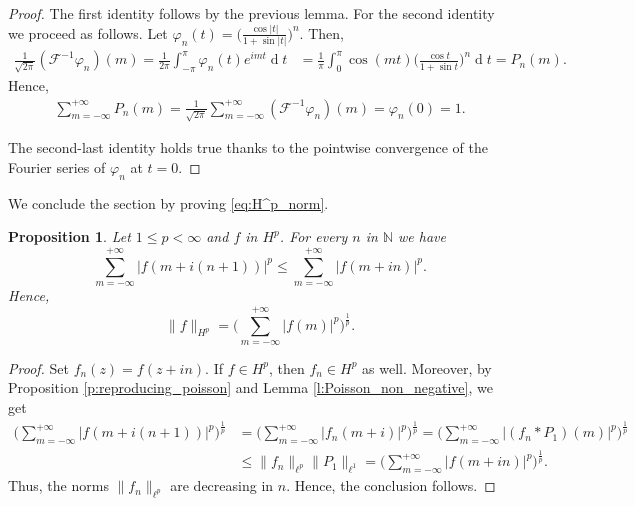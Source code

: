 \documentclass[12pt,a4paper,reqno]{amsart}
\newtheorem{prop}[thm]{Proposition}
\theoremstyle{definition}
\theoremstyle{definition}\newtheorem{defn}[thm]{Definition}
\begin{document}
    \begin{proof}
    The first identity follows by the previous lemma. For the second identity we proceed as follows.
     Let $\varphi_n(t)=\Big(\frac{\cos|t|}{1+\sin|t|}\Big)^n$. Then, 
    \begin{align}\label{eq:Poisson_coefficient}
     \frac{1}{\sqrt{2\pi}}(\mathcal F^{-1}\varphi_n)(m)=\frac{1}{2\pi}\int_{-\pi}^{\pi}\varphi_n(t) e^{imt}\operatorname{d}\!t&=\frac{1}{\pi}\int_0^\pi \cos(mt)\Big(\frac{\cos t}{1+\sin t }\Big)^n\operatorname{d}\! t=P_n(m).   
    \end{align}
    Hence,
    \begin{align*}
     \sum_{m=-\infty}^{+\infty}P_n(m)=\frac{1}{\sqrt{2\pi}} \sum_{m=-\infty}^{+\infty}(\mathcal F^{-1}\varphi_n)(m)= \varphi_n(0)=1.   \end{align*}
    
     
    The second-last identity holds true thanks to the pointwise convergence of the Fourier series of $\varphi_n$ at $t=0$.
    \end{proof}
    
    
    
    We conclude the section by proving \eqref{eq:H^p_norm}.
    \begin{prop}\label{p:H^p_norm_2} 
    Let $1\leqslant p<\infty$ and $f$ in $H^p$. For every $n$ in $\mathbb N$ we have
    \[
    \sum_{m=-\infty}^{+\infty} |f(m+i(n+1))|^p\leqslant \sum_{m=-\infty}^{+\infty}|f(m+in)|^p.
    \]
    Hence,
    \[
    \|f\|_{H^p}=\Big(\sum_{m=-\infty}^{+\infty}|f(m)|^p\Big)^{\frac 1p}.
    \]
    \end{prop}
    
    \begin{proof}
      Set $f_n(z)=f(z+in)$. If $f\in H^p$, then $f_n\in H^p$ as well. Moreover, by Proposition \ref{p:reproducing_poisson} and Lemma \ref{l:Poisson_non_negative}, we get
    \begin{align*}
    \Big(\sum_{m=-\infty}^{+\infty}|f(m+i(n+1))|^p\Big)^{\frac1p}&=\Big(\sum_{m=-\infty}^{+\infty}|f_n(m+i)|^p\Big)^{\frac1p}=\Big(\sum_{m=-\infty}^{+\infty}|(f_n\ast P_1)(m)|^p\Big)^{\frac1p}   \\
    &\leqslant \|f_n\|_{\ell^p}\|P_1\|_{\ell^1}=\Big(\sum_{m=-\infty}^{+\infty}|f(m+in)|^p\Big)^{\frac1p}.   
    \end{align*}
    Thus, the norms $\|f_n\|_{\ell^p}$ are decreasing in $n$. Hence, the conclusion follows.
    \end{proof}
    
\end{document}
